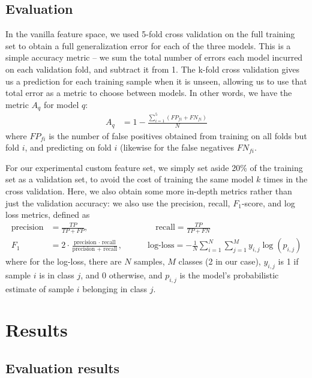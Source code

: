 \documentclass{article} %
\begin{document}
\subsection{Evaluation}
In the vanilla feature space, we used 5-fold cross validation on the full training set to obtain a full generalization error for each of the three models.  This is a simple accuracy metric -- we sum the total number of errors each model incurred on each validation fold, and subtract it from 1.  The k-fold cross validation gives us a prediction for each training sample when it is unseen, allowing us to use that total error as a metric to choose between models.  In other words, we have the metric $A_q$ for model $q$:
\begin{align*}
A_q &= 1 - \frac{\sum_{i=1}^5(FP_{fi} + FN_{fi})}{N}
\end{align*}
where $FP_{fi}$ is the number of false positives obtained from training on all folds but fold $i$, and predicting on fold $i$ (likewise for the false negatives $FN_{fi}$.\par
For our experimental custom feature set, we simply set aside 20\% of the training set as a validation set, to avoid the cost of training the same model $k$ times in the cross validation.  Here, we also obtain some more in-depth metrics rather than just the validation accuracy: we also use the precision, recall, $F_1$-score, and log loss metrics, defined as
\begin{align*}
\text{precision} &= \frac{TP}{TP + FP}, \hspace{8em} \text{recall} = \frac{TP}{TP + FN}\\
F_1 &= 2 \cdot \frac{\text{precision } \cdot \text{ recall}}{\text{precision } + \text{ recall}}, \hspace{3em} \text{log-loss} = -\frac{1}{N}\sum_{i=1}^N\sum_{j=1}^My_{i,j}\log(p_{i,j})
\end{align*}
where for the log-loss, there are $N$ samples, $M$ classes (2 in our case), $y_{i,j}$ is 1 if sample $i$ is in class $j$, and 0 otherwise, and $p_{i,j}$ is the model's probabilistic estimate of sample $i$ belonging in class $j$.
\section{Results}
\subsection{Evaluation results}
\end{document}
